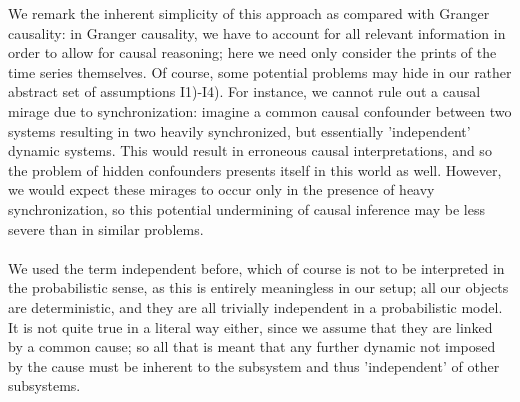 \documentclass[11pt, a4paper]{memoir}
\theoremstyle{break}
\theoremstyle{break}
\theoremstyle{nonumberplain}
\begin{document}
We remark the inherent simplicity of this approach as compared with Granger causality: in Granger causality, we have to account for all relevant information in order to allow for causal reasoning; here we need only consider the prints of the time series themselves. Of course, some potential problems may hide in our rather abstract set of assumptions I1)-I4). For instance, we cannot rule out a causal mirage due to synchronization: imagine a common causal confounder between two systems resulting in two heavily synchronized, but essentially 'independent' dynamic systems. This would result in erroneous causal interpretations, and so the problem of hidden confounders presents itself in this world as well. However, we would expect these mirages to occur only in the presence of heavy synchronization, so this potential undermining of causal inference may be less severe than in similar problems.\\\\ 
We used the term independent before, which of course is not to be interpreted in the probabilistic sense, as this is entirely meaningless in our setup; all our objects are deterministic, and they are all trivially independent in a probabilistic model. It is not quite true in a literal way either, since we assume that they are linked by a common cause; so all  that is meant that any further dynamic not imposed by the cause must be inherent to the subsystem and thus 'independent' of other subsystems.
\end{document}
